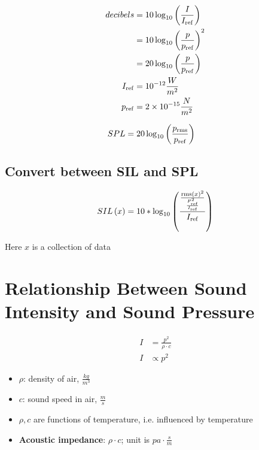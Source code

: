   \begin{align}
    decibels &= 10 \log_{10}\left( \frac{I}{I_{\operatorname{ref}}} \right) \\
    &= 10 \log_{10} \left( \frac{p}{p_{\operatorname{ref}}} \right)^{2} \\
    &= 20 \log_{10} \left( \frac{p}{p_{\operatorname{ref}}} \right) \\
    I_{\operatorname{ref}} &= 10^{-12} \frac{W}{m^{2}} \\
    p_{\operatorname{ref}} &= 2 \times 10^{-15} \frac{N}{m^{2}}
  \end{align}

  \begin{align}
    SPL &= 20 \log_{10}\left( \frac{p_{\operatorname{rms}}}{p_{\operatorname{ref}}} \right)
  \end{align}

  \subsection{Convert between SIL and SPL}

    \begin{equation}
      SIL\left( x \right) = 10 * \log_{10}
      \left(
        \frac
        {
          \frac
          {
            \operatorname{rms}\left( x \right)^{2}
          }
          {
            \frac{P_{\operatorname{ref}}^{2}}{I_{\operatorname{ref}}}
          }
        }
        {I_{\operatorname{ref}}}
      \right)
    \end{equation}

    Here $ x $ is a collection of data

\section{Relationship Between Sound Intensity and Sound Pressure}

  \begin{align}
    I &= \frac{p^{2}}{\rho \cdot c} \\
    I &\propto p^{2}
  \end{align}

  \begin{itemize}
    \item $ \rho $: density of air, $ \frac{kg}{m^{3}} $
    \item $ c $: sound speed in air, $ \frac{m}{s} $
    \item $ \rho, c $ are functions of temperature, i.e. influenced by
    temperature
    \item \textbf{Acoustic impedance}: $ \rho \cdot c $;
    unit is $ pa \cdot \frac{s}{m} $
  \end{itemize}


